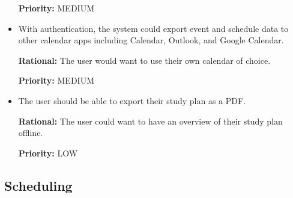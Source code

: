 \documentclass[12pt]{article}
\newcounter{reqnum} %
\newcommand{\rthereqnum}{FR\refstepcounter{reqnum}\thereqnum:}
\begin{document}
\begin{itemize}
\textbf{Priority:} MEDIUM
\item[\rthereqnum]
With authentication, the system could export event and schedule data to other calendar apps including Calendar, Outlook, and Google Calendar.

\textbf{Rational:} The user would want to use their own calendar of choice.

\textbf{Priority:} MEDIUM
\item[\rthereqnum]
The user should be able to export their study plan as a PDF.

\textbf{Rational:} The user could want to have an overview of their study plan offline.

\textbf{Priority:} LOW
\end{itemize}

\subsection{Scheduling}
\end{document}
